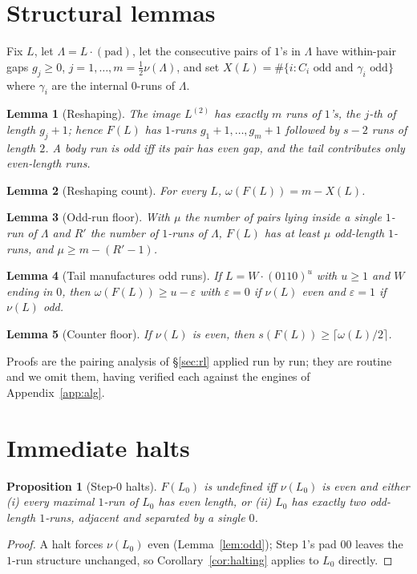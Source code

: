 \documentclass[11pt,reqno]{amsart}
\theoremstyle{plain}
\newtheorem{proposition}{Proposition}
\newtheorem{lemma}{Lemma}
\theoremstyle{definition}
\theoremstyle{remark}
\begin{document}
\section{Structural lemmas}\label{sec:struct}
Fix $L$, let $\Lambda=L\cdot(\text{pad})$, let the consecutive pairs of $1$'s in $\Lambda$ have within-pair gaps $g_j\ge 0$, $j=1,\dots,m=\tfrac12\nu(\Lambda)$, and set $X(L)=\#\{i:C_i\text{ odd and }\gamma_i\text{ odd}\}$ where $\gamma_i$ are the internal $0$-runs of $\Lambda$.

\begin{lemma}[Reshaping]\label{lem:reshape}
The image $L^{(2)}$ has exactly $m$ runs of $1$'s, the $j$-th of length $g_j+1$; hence $F(L)$ has $1$-runs $g_1+1,\dots,g_m+1$ followed by $s-2$ runs of length $2$. A body run is odd iff its pair has even gap, and the tail contributes only even-length runs.
\end{lemma}

\begin{lemma}[Reshaping count]\label{lem:reshapecount}
For every $L$, $\omega(F(L))=m-X(L)$.
\end{lemma}

\begin{lemma}[Odd-run floor]\label{lem:oddrunfloor}
With $\mu$ the number of pairs lying inside a single $1$-run of $\Lambda$ and $R'$ the number of $1$-runs of $\Lambda$, $F(L)$ has at least $\mu$ odd-length $1$-runs, and $\mu\ge m-(R'-1)$.
\end{lemma}

\begin{lemma}[Tail manufactures odd runs]\label{lem:tailodd}
If $L=W\cdot(0110)^u$ with $u\ge 1$ and $W$ ending in $0$, then $\omega(F(L))\ge u-\varepsilon$ with $\varepsilon=0$ if $\nu(L)$ even and $\varepsilon=1$ if $\nu(L)$ odd.
\end{lemma}

\begin{lemma}[Counter floor]\label{lem:cfloor}
If $\nu(L)$ is even, then $s(F(L))\ge\lceil\omega(L)/2\rceil$.
\end{lemma}

Proofs are the pairing analysis of \S\ref{sec:rl} applied run by run; they are routine and we omit them, having verified each against the engines of Appendix~\ref{app:alg}.

\section{Immediate halts}\label{sec:step0}
\begin{proposition}[Step-$0$ halts]\label{prop:step0}
$F(L_0)$ is undefined iff $\nu(L_0)$ is even and either (i) every maximal $1$-run of $L_0$ has even length, or (ii) $L_0$ has exactly two odd-length $1$-runs, adjacent and separated by a single $0$.
\end{proposition}
\begin{proof}
A halt forces $\nu(L_0)$ even (Lemma~\ref{lem:odd}); Step 1's pad $00$ leaves the $1$-run structure unchanged, so Corollary~\ref{cor:halting} applies to $L_0$ directly.
\end{proof}
\end{document}
